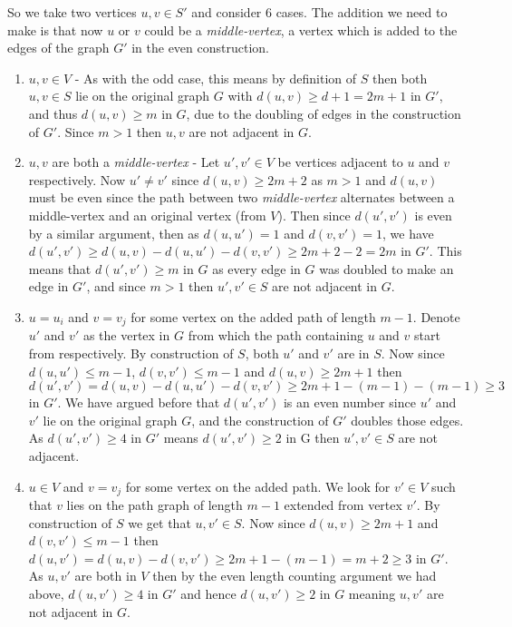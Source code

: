 \documentclass[10pt, a4paper]{article}
\theoremstyle{definition}
\begin{document}
So we take two vertices $u,v \in S'$ and consider 6 cases. The addition we need to make is that now $u$ or $v$ could be a \emph{middle-vertex}, a vertex which is added to the edges of the graph $G'$ in the even construction.

\begin{enumerate}
	\item $u,v \in V$ - As with the odd case, this means by definition of $S$ then both $u,v \in S$ lie on the original graph $G$ with $d(u,v) \geq d + 1 = 2m + 1$ in $G'$, and thus $d(u,v) \geq m$ in $G$, due to the doubling of edges in the construction of $G'$. Since $m > 1$ then $u,v$ are not adjacent in $G$.

	\item $u,v$ are both a \emph{middle-vertex} - Let $u',v' \in V$ be vertices adjacent to $u$ and $v$ respectively. Now $u' \neq v'$ since $d(u,v) \geq 2m + 2$ as $m>1$ and $d(u,v)$ must be even since the path between two \emph{middle-vertex} alternates between a middle-vertex and an original vertex (from $V$). Then since $d(u',v')$ is even by a similar argument, then as $d(u,u') = 1$ and $d(v,v') = 1$, we have $d(u',v') \geq d(u,v) - d(u,u') - d(v,v') \geq 2m + 2 - 2  = 2m$ in $G'$. This means that $d(u',v') \geq m$ in $G$ as every edge in $G$ was doubled to make an edge in $G'$, and since $m > 1$ then $u',v' \in S$ are not adjacent in $G$.  

	\item $u = u_i$ and $ v = v_j$ for some vertex on the added path of length $m-1$. Denote $u'$ and $v'$ as the vertex in $G$ from which the path containing $u$ and $v$ start from respectively. By construction of $S$, both $u'$ and $v'$ are in $S$. Now since $d(u,u') \leq m-1$, $d(v,v') \leq m-1$ and $d(u,v) \geq 2m + 1$ then $d(u',v') = d(u,v) - d(u,u') - d(v,v') \geq 2m + 1 - (m-1) - (m-1) \geq 3$ in $G'$. We have argued before that $d(u',v')$ is an even number since $u'$ and $v'$ lie on the original graph $G$, and the construction of $G'$ doubles those edges. As $d(u',v') \geq 4$ in $G'$ means $d(u',v') \geq 2$ in G then $u',v' \in S$ are not adjacent.

	\item $u \in V$ and $v = v_j$ for some vertex on the added path. We look for $v' \in V$ such that $v$ lies on the path graph of length $m-1$ extended from vertex $v'$. By construction of $S$ we get that $u,v' \in S$. Now since $d(u,v) \geq 2m+1$ and $d(v,v') \leq m - 1$ then $d(u,v') = d(u,v) - d(v,v') \geq 2m + 1 - (m-1) = m + 2 \geq 3$ in $G'$. As $u,v'$ are both in $V$ then by the even length counting argument we had above, $d(u,v') \geq 4$ in $G'$ and hence $d(u,v') \geq 2$ in $G$ meaning $u,v'$ are not adjacent in $G$.


\end{enumerate}
\end{document}
